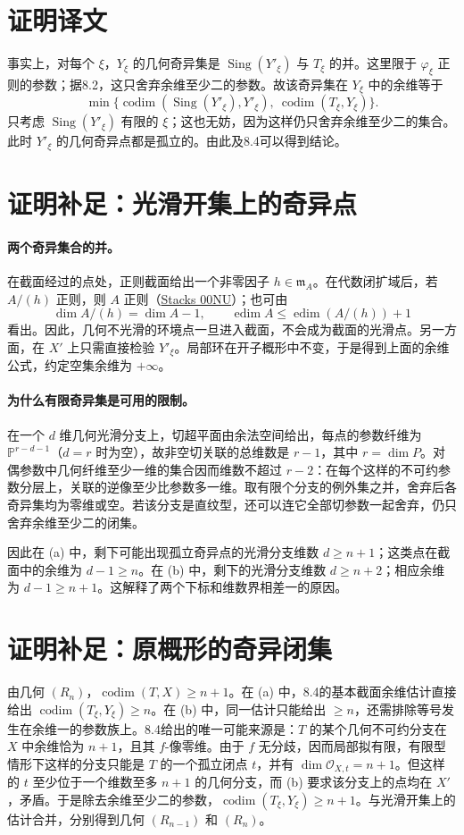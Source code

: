 \documentclass[openany,fontset=fandol]{ctexbook}
\newcommand{\cod}{\operatorname{codim}}
\newcommand{\Sing}{\operatorname{Sing}}
\begin{document}
\newpage
\section*{证明译文}
事实上，对每个 $\xi$，$Y_\xi$ 的几何奇异集是 $\Sing(Y'_\xi)$ 与 $T_\xi$ 的并。这里限于 $\varphi_\xi$ 正则的参数；据8.2，这只舍弃余维至少二的参数。故该奇异集在 $Y_\xi$ 中的余维等于
\[
 \min\bigl\{\cod(\Sing(Y'_\xi),Y'_\xi),
                   \ \cod(T_\xi,Y_\xi)\bigr\}.
\]
只考虑 $\Sing(Y'_\xi)$ 有限的 $\xi$；这也无妨，因为这样仍只舍弃余维至少二的集合。此时 $Y'_\xi$ 的几何奇异点都是孤立的。由此及8.4可以得到结论。

\section*{证明补足：光滑开集上的奇异点}
\paragraph{两个奇异集合的并。}
在截面经过的点处，正则截面给出一个非零因子 $h\in\mathfrak m_A$。在代数闭扩域后，若 $A/(h)$ 正则，则 $A$ 正则（\href{https://stacks.math.columbia.edu/tag/00NU}{Stacks 00NU}）；也可由
\[
 \dim A/(h)=\dim A-1,\qquad
 \operatorname{edim}A\le \operatorname{edim}(A/(h))+1
\]
看出。因此，几何不光滑的环境点一旦进入截面，不会成为截面的光滑点。另一方面，在 $X'$ 上只需直接检验 $Y'_\xi$。局部环在开子概形中不变，于是得到上面的余维公式，约定空集余维为 $+\infty$。

\paragraph{为什么有限奇异集是可用的限制。}
在一个 $d$ 维几何光滑分支上，切超平面由余法空间给出，每点的参数纤维为 $\mathbb P^{r-d-1}$（$d=r$ 时为空），故非空切关联的总维数是 $r-1$，其中 $r=\dim P$。对偶参数中几何纤维至少一维的集合因而维数不超过 $r-2$：在每个这样的不可约参数分层上，关联的逆像至少比参数多一维。取有限个分支的例外集之并，舍弃后各奇异集均为零维或空。若该分支是直纹型，还可以连它全部切参数一起舍弃，仍只舍弃余维至少二的闭集。

因此在 (a) 中，剩下可能出现孤立奇异点的光滑分支维数 $d\ge n+1$；这类点在截面中的余维为 $d-1\ge n$。在 (b) 中，剩下的光滑分支维数 $d\ge n+2$；相应余维为 $d-1\ge n+1$。这解释了两个下标和维数界相差一的原因。

\newpage
\section*{证明补足：原概形的奇异闭集}
由几何 $(R_n)$，$\cod(T,X)\ge n+1$。在 (a) 中，8.4的基本截面余维估计直接给出 $\cod(T_\xi,Y_\xi)\ge n$。在 (b) 中，同一估计只能给出 $\ge n$，还需排除等号发生在余维一的参数族上。8.4给出的唯一可能来源是：$T$ 的某个几何不可约分支在 $X$ 中余维恰为 $n+1$，且其 $f$-像零维。由于 $f$ 无分歧，因而局部拟有限，有限型情形下这样的分支只能是 $T$ 的一个孤立闭点 $t$，并有 $\dim\mathcal O_{X,t}=n+1$。但这样的 $t$ 至少位于一个维数至多 $n+1$ 的几何分支，而 (b) 要求该分支上的点均在 $X'$，矛盾。于是除去余维至少二的参数，$\cod(T_\xi,Y_\xi)\ge n+1$。与光滑开集上的估计合并，分别得到几何 $(R_{n-1})$ 和 $(R_n)$。
\end{document}
